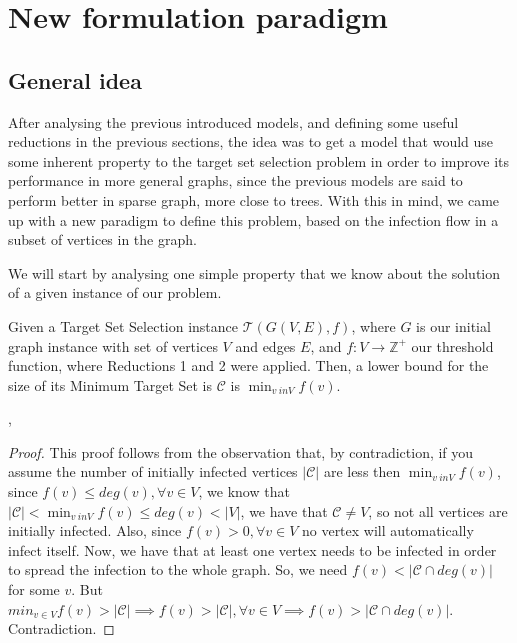 \section{New formulation paradigm}

\subsection{General idea}

After analysing the previous introduced models, and defining some useful reductions in the previous sections, the idea was to get a model that would use some inherent property to the target set selection problem in order to improve its performance in more general graphs, since the previous models are said to perform better in sparse graph, more close to trees. With this in mind, we came up with a new paradigm to define this problem, based on the infection flow in a subset of vertices in the graph.

We will start by analysing one simple property that we know about the solution of a given instance of our problem.
\begin{myprop}
Given a Target Set Selection instance $ \mathcal{T} (G (V, E), f) $, where $G$ is our initial graph instance with set of vertices $V$ and edges $E$, and $f: V \to \mathbb{Z}^+$ our threshold function,  where Reductions 1 and 2 were applied. Then, a lower bound for the size of its Minimum Target Set is $\mathcal{C}$ is $\min_{v \ in V} f(v)$. 
\end{myprop},

\begin{proof}
This proof follows from the observation that, by contradiction, if you assume the number of initially infected vertices $|\mathcal{C}|$ are less then $ \min_{v \ in V} f(v) $,
since $f(v) \leq deg(v), \forall v \in V$, we know that $|\mathcal{C}| < \min_{v \ in V} f(v) \leq deg(v) < |V| $, we have that $\mathcal{C} \neq V$, so not all vertices are initially infected. Also, since $f(v) > 0, \forall v \in V$ no vertex will automatically infect itself. Now, we have that at least one vertex needs to be infected in order to spread the infection to the whole graph. So, we need $f(v) < |	\mathcal{C} \cap deg(v)|$ for some $v$. But $min_{v \in V} f(v) > |\mathcal{C}| \implies f(v) > |\mathcal{C}|, \forall v \in V \implies f(v) > |\mathcal{C} \cap deg(v)|$. Contradiction.
\end{proof}

